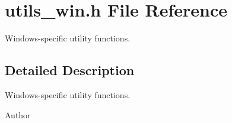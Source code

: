 \section{utils\-\_\-win.\-h File Reference}
\label{utils__win_8h}


Windows-\/specific utility functions.  




\subsection{Detailed Description}
Windows-\/specific utility functions. \begin{DoxyAuthor}{Author}

\end{DoxyAuthor}
